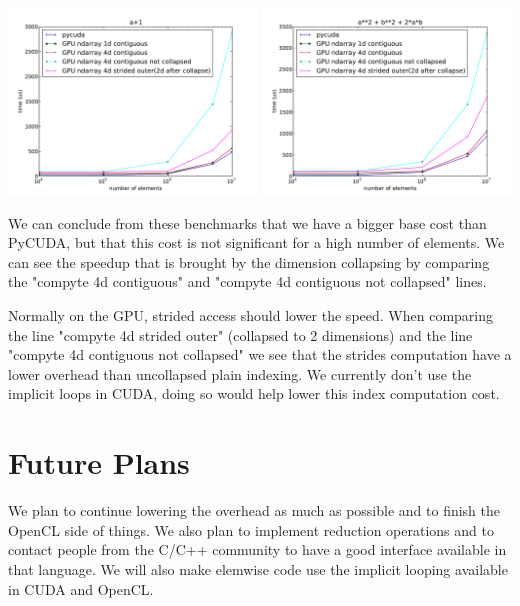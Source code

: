 \documentclass{article} %
\begin{document}
\includegraphics[width=0.495\textwidth]{ap1_no_alloc}
\includegraphics[width=0.495\textwidth]{a2pb2p2ab_no_alloc}

We can conclude from these benchmarks that we have a bigger base cost than PyCUDA, but that this cost is not significant for a high number of elements.
We can see the speedup that is brought by the dimension collapsing by comparing the "compyte 4d contiguous" and "compyte 4d contiguous not collapsed" lines.

Normally on the GPU, strided access should lower the speed.
When comparing the line "compyte 4d strided outer" (collapsed to 2 dimensions) and the line "compyte 4d contiguous not collapsed" we see that the strides computation have a lower overhead than uncollapsed plain indexing.
We currently don't use the implicit loops in CUDA, doing so would help lower this index computation cost.

\section{Future Plans}

We plan to continue lowering the overhead as much as possible and to finish the OpenCL side of things.
We also plan to implement reduction operations and to contact people from the C/C++ community to have a good interface available in that language.
We will also make elemwise code use the implicit looping available in CUDA and OpenCL.
\end{document}
